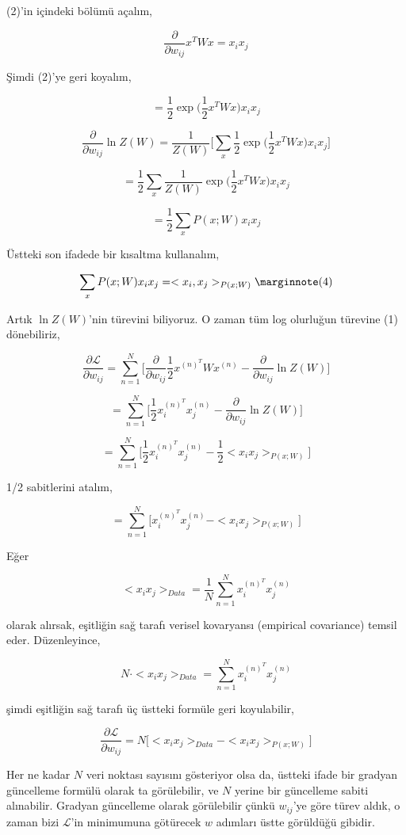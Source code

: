 \documentclass[12pt,fleqn]{article}\usepackage{../../common}
\begin{document}
(2)'in içindeki bölümü açalım,

$$ 
\frac{\partial}{\partial w_{ij}}x^T W x = x_i x_j 
$$

Şimdi (2)'ye geri koyalım,

$$ 
= \frac{1}{2} \exp \big( \frac{1}{2} x^T W x \big) x_i x_j
$$

$$ 
\frac{\partial}{\partial w_{ij}} \ln Z(W) = 
\frac{1}{Z(W)}
\bigg[ 
\sum_x \frac{1}{2}  \exp \big( \frac{1}{2} x^T W x \big) x_i x_j
\bigg]
$$

$$ 
= \frac{1}{2} \sum_x 
\frac{1}{Z(W)} \exp \big( \frac{1}{2} x^T W x \big) x_i x_j 
$$

$$ 
= \frac{1}{2}  \sum_x P(x;W) x_i x_j
$$

Üstteki son ifadede bir kısaltma kullanalım,

$$ 
\sum_x P(x;W) x_i x_j =  < x_i,x_j >_{P(x;W)}
\mlabel{4}
$$

Artık $\ln Z(W)$'nin türevini biliyoruz. O zaman tüm log olurluğun türevine
(1) dönebiliriz, 

$$  
\frac{\partial \mathcal{L}}{\partial w_{ij}} = 
\sum _{n=1}^{N} \bigg[ 
\frac{\partial}{\partial w_{ij}}  \frac{1}{2} x^{(n)^T} W x^{(n)} - 
\frac{\partial}{\partial w_{ij}}  \ln Z(W) \bigg]
$$

$$  
= \sum_{n=1}^{N} 
\bigg[ 
\frac{1}{2} x_i^{(n)^T}x_j^{(n)} - 
\frac{\partial}{\partial w_{ij}}  \ln Z(W) 
\bigg]
$$

$$  
= \sum _{n=1}^{N} 
\bigg[ 
\frac{1}{2} x_i^{(n)^T}x_j^{(n)} - 
\frac{1}{2}< x_i x_j >_{P(x;W)}
\bigg]
$$ 

1/2 sabitlerini atalım, 

$$  
= \sum _{n=1}^{N} 
\bigg[ 
 x_i^{(n)^T}x_j^{(n)} - < x_i x_j >_{P(x;W)}
\bigg]
$$

Eğer 

$$
< x_i x_j >_{Data} = \frac{1}{N} \sum _{n=1}^{N}  x_i^{(n)^T}x_j^{(n)}
$$

olarak alırsak, eşitliğin sağ tarafı verisel kovaryansı (empirical
covariance) temsil eder. Düzenleyince,

$$ 
N \cdot < x_i x_j >_{Data} = \sum _{n=1}^{N}  x_i^{(n)^T}x_j^{(n)}
$$

şimdi eşitliğin sağ tarafı üç üstteki formüle geri koyulabilir,

$$ 
\frac{\partial \mathcal{L}}{\partial w_{ij}}  = 
N \big[ < x_i x_j >_{Data}  - < x_ix_j >_{P(x;W)} \big] 
$$

Her ne kadar $N$ veri noktası sayısını gösteriyor olsa da, üstteki ifade
bir gradyan güncelleme formülü olarak ta görülebilir, ve $N$ yerine bir
güncelleme sabiti alınabilir. Gradyan güncelleme olarak görülebilir çünkü
$w_{ij}$'ye göre türev aldık, o zaman bizi $\mathcal{L}$'in minimumuna götürecek
$w$ adımları üstte görüldüğü gibidir. 
\end{document}

